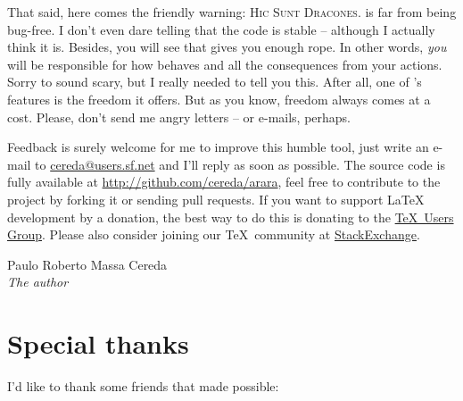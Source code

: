 \documentclass[a4paper,twoside,12pt]{memoir}
\begin{document}
That said, here comes the friendly warning: \textsc{Hic Sunt Dracones}. \arara 
is far from being bug-free. I don't even dare telling that the code is stable 
-- although I actually think it is. Besides, you will see that \arara gives you
enough rope. In other words, \emph{you} will be responsible for how \arara 
behaves and all the consequences from your actions. Sorry to sound scary, but I
really needed to tell you this. After all, one of \arara's features is the 
freedom it offers. But as you know, freedom always comes at a cost. Please, 
don't send me angry letters -- or e-mails, perhaps.

Feedback is surely welcome for me to improve this humble tool, just write an 
e-mail to \url{cereda@users.sf.net} and I'll reply as soon as possible. The 
source code is fully available at \url{http://github.com/cereda/arara}, feel 
free to contribute to the project by forking it or sending pull requests. If 
you want to support \LaTeX{} development by a donation, the best way to do this
is donating to the \href{http://www.tug.org/}{\TeX\ Users Group}. Please also 
consider joining our \TeX\ community at 
\href{http://tex.stackexchange.com}{StackExchange}.

\vfill

\begin{flushright}
Paulo Roberto Massa Cereda\\
\emph{The author}
\end{flushright}

\cleardoublepage

\section*{Special thanks}

I'd like to thank some friends that made \arara possible:
\end{document}
